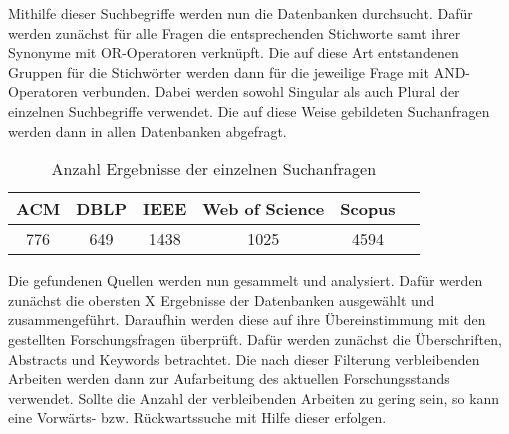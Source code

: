 Mithilfe dieser Suchbegriffe werden nun die Datenbanken durchsucht. Dafür werden zunächst für alle Fragen die entsprechenden Stichworte samt ihrer Synonyme mit OR-Operatoren verknüpft. Die auf diese Art entstandenen Gruppen für die Stichwörter werden dann für die jeweilige Frage mit AND-Operatoren verbunden. Dabei werden sowohl Singular als auch Plural der einzelnen Suchbegriffe verwendet. Die auf diese Weise gebildeten Suchanfragen werden dann in allen Datenbanken abgefragt.

\begin{table}[htbp]
    \centering
    \begin{tabular}{|c|c|c|c|c|c|}
        \hline
        ACM & DBLP & IEEE & Web of Science & Scopus \\
        \hline
        776 & 649  & 1438 & 1025           & 4594   \\
        \hline
    \end{tabular}
    \caption{Anzahl Ergebnisse der einzelnen Suchanfragen}
    \label{table:amount-search-results}
\end{table}

Die gefundenen Quellen werden nun gesammelt und analysiert. Dafür werden zunächst die obersten X Ergebnisse der Datenbanken ausgewählt und zusammengeführt. Daraufhin werden diese auf ihre Übereinstimmung mit den gestellten Forschungsfragen überprüft. Dafür werden zunächst die Überschriften, Abstracts und Keywords betrachtet. Die nach dieser Filterung verbleibenden Arbeiten werden dann zur Aufarbeitung des aktuellen Forschungsstands verwendet. Sollte die Anzahl der verbleibenden Arbeiten zu gering sein, so kann eine Vorwärts- bzw. Rückwartssuche mit Hilfe dieser erfolgen.